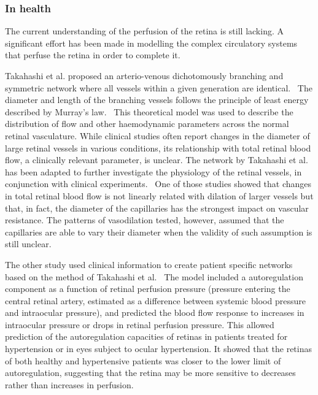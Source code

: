 \documentclass[12pt,a4paper]{journal}
\begin{document}
\subsubsection*{In health}

The current understanding of the perfusion of the retina is still lacking.
A significant effort has been made in modelling the complex circulatory systems that perfuse the retina in order to complete it.


Takahashi et al. proposed an arterio-venous dichotomously branching and symmetric network where all vessels within a given generation are identical.~\cite{Takahashi_2009}
The diameter and length of the branching vessels follows the principle of least energy described by Murray's law.~\cite{Murray_1926}
This theoretical model was used to describe the distribution of flow and other haemodynamic parameters across the normal retinal vasculature.
While clinical studies often report changes in the diameter of large retinal vessels in various conditions, its relationship with total retinal blood flow, a clinically relevant parameter, is unclear.
The network by Takahashi et al. has been adapted to further investigate the physiology of the retinal vessels, in conjunction with clinical experiments.~\cite{Aschinger_2017,Pappelis_2020}
One of those studies showed that changes in total retinal blood flow is not linearly related with dilation of larger vessels but that, in fact, the diameter of the capillaries has the strongest impact on vascular resistance.
The patterns of vasodilation tested, however, assumed that the capillaries are able to vary their diameter when the validity of such assumption is still unclear.~\cite{Kur_2012}

The other study used clinical information to create patient specific networks based on the method of Takahashi et al.~\cite{Pappelis_2020}
The model included a autoregulation component as a function of retinal perfusion pressure (pressure entering the central retinal artery, estimated as a difference between systemic blood pressure and intraocular pressure), and predicted the blood flow response to increases in intraocular pressure or drops in retinal perfusion pressure.
This allowed prediction of the autoregulation capacities of retinas in patients treated for hypertension or in eyes subject to ocular hypertension.
It showed that the retinas of both healthy and hypertensive patients was closer to the lower limit of autoregulation, suggesting that the retina may be more sensitive to decreases rather than increases in perfusion.~\cite{Pappelis_2020}
\end{document}
